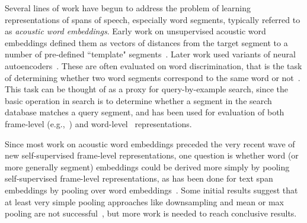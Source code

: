 Several lines of work have begun to address the problem of learning representations of spans of speech, especially word segments, typically referred to as \textit{acoustic word embeddings}.  Early work on unsupervised acoustic word embeddings defined them as vectors of distances from the target segment to a number of pre-defined ``template" segments~\cite{levin+etal_asru13}. Later work used variants of neural autoencoders~\cite{Chung2016AudioWord2Vec,holzenberger2018learning,kamper2019truly,pengcorrespondence}. These are often evaluated on word discrimination, that is the task of determining whether two word segments correspond to the same word or not~\cite{carlin2011rapid}. This task can be thought of as a proxy for query-by-example search, since the basic operation in search is to determine whether a segment in the search database matches a query segment, and has been used for evaluation of both frame-level (e.g.,~\cite{kamper2015unsupervised}) and word-level~\cite{levin+etal_asru13,kamper2016deep} representations.  


Since most work on acoustic word embeddings preceded the very recent wave of new self-supervised frame-level representations, one question is whether word (or more generally segment) embeddings could be derived more simply by pooling self-supervised frame-level representations, as has been done for text span embeddings by pooling over word embeddings~\cite{toshniwal2020cross,wang2021phrase}. Some initial results suggest that at least very simple pooling approaches like downsampling and mean or max pooling are not successful~\cite{van2021comparison,pengcorrespondence}, but more work is needed to reach conclusive results.








